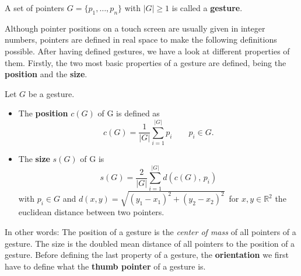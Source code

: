 \begin{defn}
 A set of pointers $G = \{p_1,\dots , p_n\}$ with $|G| \geq 1$ is called a \textbf{gesture}.
\end{defn}

Although pointer positions on a touch screen are usually given in integer numbers, pointers are defined in real space to make the following definitions possible. After having defined gestures, we have a look at different properties of them. Firstly, the two most basic properties of a gesture are defined, being the \textbf{position} and the \textbf{size}.

\begin{defn}
	Let $G$ be a gesture.
	
\begin{itemize}
	\item The \textbf{position} $c(G)$ of G is defined as
	\begin{equation}
	c(G) = \frac{1}{|G|}\sum_{i=1}^{|G|}p_i \qquad  p_i \in G\text{.}
	\end{equation}
	
	\item The \textbf{size} $s(G)$ of G is
	\begin{equation}
	s(G) = \frac{2}{|G|}\sum_{i=1}^{|G|} d(c(G), \, p_i)
	\end{equation}
	with $p_i \in G$ and $d(x, y) = \sqrt{(y_1 - x_1)^2 + (y_2 - x_2)^2}\,$ for $x, y \in \mathbb{R}^2$ the euclidean distance between two pointers.
\end{itemize}
\end{defn}

In other words: The position of a gesture is the \textit{center of mass} of all pointers of a gesture. The size is the doubled mean distance of all pointers to the position of a gesture. Before defining the last property of a gesture, the \textbf{orientation} we first have to define what the \textbf{thumb pointer} of a gesture is.

